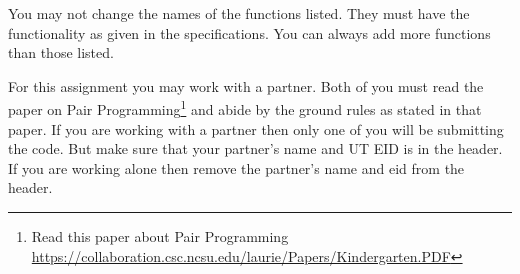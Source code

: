 \documentclass[12pt]{article}
\begin{document}
You may not change the names of the functions listed. They must have the functionality as given in the specifications. You can always add more functions than those listed.

For this assignment you may work with a partner. Both of you must read the paper on 
Pair Programming\footnote{Read this paper about Pair Programming \url{https://collaboration.csc.ncsu.edu/laurie/Papers/Kindergarten.PDF}} and abide by the ground 
rules as stated in that paper. 
If you are working with a partner then only one of you will be submitting the code. But make sure that your partner's name and UT EID is in the header. 
If you are working alone then remove the partner's name and eid from the header.







\end{document}
